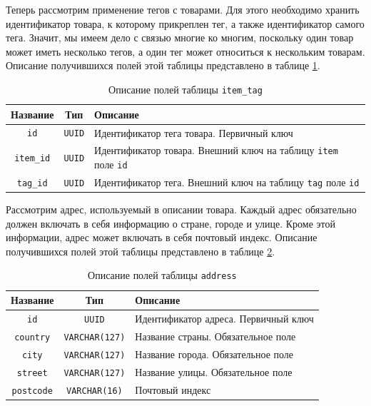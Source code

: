 \documentclass[a4paper,14pt]{extarticle}
\begin{document}
Теперь рассмотрим применение тегов с товарами. Для этого необходимо хранить идентификатор товара, к которому прикреплен тег, а также идентификатор самого тега. Значит, мы имеем дело с связью многие ко многим, поскольку один товар может иметь несколько тегов, а один тег может относиться к нескольким товарам. Описание получившихся полей этой таблицы представлено в таблице \ref{tab:item_tag}.

\begin{center}
    \begin{longtable}{|c|c|>{\centering\arraybackslash}m{11.9cm}|}
        \caption{Описание полей таблицы \texttt{item\_tag}}
        \label{tab:item_tag}
        \\
        \hline
        \textbf{Название} & \textbf{Тип}  & \textbf{Описание}                                                            \\
        \hline
        \texttt{id}       & \texttt{UUID} & Идентификатор тега товара. Первичный ключ                                    \\
        \hline
        \texttt{item\_id} & \texttt{UUID} & Идентификатор товара. Внешний ключ на таблицу \texttt{item} поле \texttt{id} \\
        \hline
        \texttt{tag\_id}  & \texttt{UUID} & Идентификатор тега. Внешний ключ на таблицу \texttt{tag} поле \texttt{id}    \\
        \hline
    \end{longtable}
\end{center}

Рассмотрим адрес, используемый в описании товара. Каждый адрес обязательно должен включать в себя информацию о стране, городе и улице. Кроме этой информации, адрес может включать в себя почтовый индекс. Описание получившихся полей этой таблицы представлено в таблице \ref{tab:address}.

\begin{center}
    \begin{longtable}{|c|c|>{\centering\arraybackslash}m{9.9cm}|}
        \caption{Описание полей таблицы \texttt{address}}
        \label{tab:address}
        \\
        \hline
        \textbf{Название} & \textbf{Тип}          & \textbf{Описание}                    \\
        \hline
        \texttt{id}       & \texttt{UUID}         & Идентификатор адреса. Первичный ключ \\
        \hline
        \texttt{country}  & \texttt{VARCHAR(127)} & Название страны. Обязательное поле   \\
        \hline
        \texttt{city}     & \texttt{VARCHAR(127)} & Название города. Обязательное поле   \\
        \hline
        \texttt{street}   & \texttt{VARCHAR(127)} & Название улицы. Обязательное поле    \\
        \hline
        \texttt{postcode} & \texttt{VARCHAR(16)}  & Почтовый индекс                      \\
        \hline
    \end{longtable}
\end{center}
\end{document}
